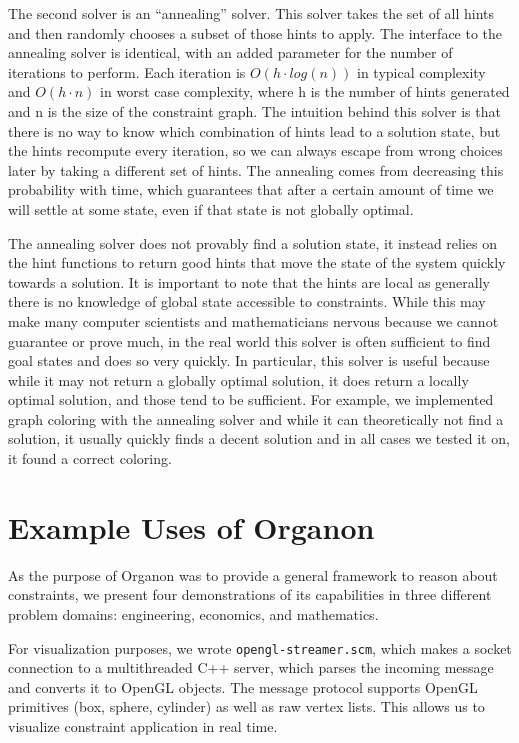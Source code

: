 \documentclass[12pt,a4paper]{article}
\begin{document}
The second solver is an ``annealing'' solver. This solver takes the set of all hints and then randomly chooses a subset of those hints to apply. The interface to the annealing solver is identical, with an added parameter for the number of iterations to perform. Each iteration is $O(h \cdot log(n))$ in typical complexity and $O(h \cdot n)$ in worst case complexity, where h is the number of hints generated and n is the size of the constraint graph.   The intuition behind this solver is that there is no way to know which combination of hints lead to a solution state, but the hints recompute every iteration, so we can always escape from wrong choices later by taking a different set of hints.  The annealing comes from decreasing this probability with time, which guarantees that after a certain amount of time we will settle at some state, even if that state is not globally optimal.  

The annealing solver does not provably find a solution state, it instead relies on the hint functions to return good hints that move the state of the system quickly towards a solution.  It is important to note that the hints are local as generally there is no knowledge of global state accessible to constraints.  While this may make many computer scientists and mathematicians nervous because we cannot guarantee or prove much, in the real world this solver is often sufficient to find goal states and does so very quickly.  In particular, this solver is useful because while it may not return a globally optimal solution, it does return a locally optimal solution, and those tend to be sufficient.  For example, we implemented graph coloring with the annealing solver and while it can theoretically not find a solution, it usually quickly finds a decent solution and in all cases we tested it on, it found a correct coloring.

\section{Example Uses of Organon}

As the purpose of Organon was to provide a general framework to reason about constraints, we present four demonstrations of its capabilities in three different problem domains: engineering, economics, and mathematics.

For visualization purposes, we wrote \texttt{opengl-streamer.scm}, which makes a socket connection to a multithreaded C++ server, which parses the incoming message and converts it to OpenGL objects. The message protocol supports OpenGL primitives (box, sphere, cylinder) as well as raw vertex lists. This allows us to visualize constraint application in real time. 
\end{document}
